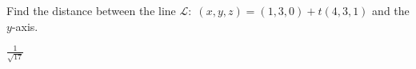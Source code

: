 
\begin{Exercise}[
name={},
title={}, 
difficulty=0,
origin={\cite{BS}}]
Find the distance between the line $\mathcal{L}:\; (x, y, z) = (1, 3, 0) + t(4, 3, 1)$ and the $y$-axis.
\end{Exercise}
\begin{Answer}
$\frac{1}{\sqrt{17}}$
\end{Answer}
